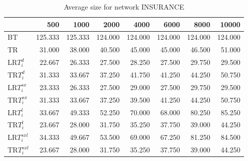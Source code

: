 \begin{table}
\begin{center}
\begin{tabular}{lrrrrrrr}
 & 500 & 1000 & 2000 & 4000 & 6000 & 8000 & 10000\\\hline
BT & 125.333 & 125.333 & 124.000 & 124.000 & 124.000 & 124.000 & 124.000\\\hline
TR & 31.000 & 38.000 & 40.500 & 45.000 & 45.000 & 46.500 & 51.000\\\hline
LR$T_i^d$ & 22.667 & 26.333 & 27.500 & 28.250 & 27.500 & 29.750 & 29.500\\\hline
TR$T_i^d$ & 31.333 & 33.667 & 37.250 & 41.750 & 41.250 & 44.250 & 50.750\\\hline
LR$T_i^{sx}$ & 23.333 & 26.333 & 27.500 & 29.000 & 27.500 & 29.750 & 29.500\\\hline
TR$T_i^{sx}$ & 31.333 & 33.667 & 37.250 & 39.500 & 41.250 & 44.250 & 50.750\\\hline
LR$T_i^l$ & 33.667 & 49.333 & 52.250 & 70.000 & 68.000 & 80.250 & 85.250\\\hline
TR$T_i^l$ & 23.667 & 28.000 & 31.750 & 35.250 & 37.750 & 39.000 & 44.250\\\hline
LR$T_i^{sxl}$ & 34.333 & 49.667 & 53.500 & 69.000 & 67.250 & 81.250 & 84.500\\\hline
TR$T_i^{sxl}$ & 23.667 & 28.000 & 31.750 & 35.250 & 37.750 & 39.000 & 44.250\\\hline
\end{tabular}
\end{center}
\caption{Average size for network INSURANCE }
\label{Insurancesi}
\end{table}

